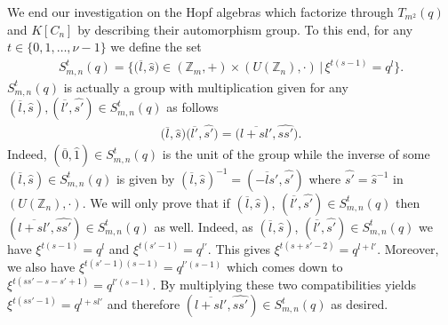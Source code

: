 \documentclass[pdftex]{sigma}
\numberwithin{equation}{section}
\begin{document}
We end our investigation on the Hopf algebras which factorize through $T_{m^{2}}(q)$ and $K[C_n]$ by describing their automorphism group. To this end, for any $t \in \{0, 1,\dots, \nu - 1\}$ we define the set
\begin{gather*}
S^{t}_{m, n}(q) = \big\{\big(\overline{l}, \widehat{s}\big) \in (\mathbb{Z}_{m}, +) \times (U(\mathbb{Z}_{n}), \cdot) \,|\, \xi^{t(s-1)} = q^{l}\big\}.
\end{gather*}
$S^{t}_{m, n}(q)$ is actually a group with multiplication given for any $(\overline{l}, \widehat{s}), (\overline{l'},\widehat{s'}) \in S^{t}_{m, n}(q)$ as follows
\begin{gather*}
\big(\overline{l}, \widehat{s}\big)\big(\overline{l'}, \widehat{s'}\big) = \big(\overline{l+sl'}, \widehat{ss'}\big).
\end{gather*}
Indeed, $(\overline{0}, \widehat{1}) \in S^{t}_{m, n}(q)$ is the unit of the group while the inverse of some $(\overline{l}, \widehat{s}) \in S^{t}_{m, n}(q)$ is given by $(\overline{l}, \widehat{s})^{-1} = (\overline{-ls'}, \widehat{s'})$ where $\widehat{s'} =\widehat{s}^{-1}$ in $(U(\mathbb{Z}_{n}), \cdot)$. We will only prove that if $(\overline{l}, \widehat{s})$, $(\overline{l'},\widehat{s'}) \in S^{t}_{m, n}(q)$ then $(\overline{l+sl'}, \widehat{ss'}) \in S^{t}_{m, n}(q)$ as well. Indeed, as $(\overline{l}, \widehat{s})$, $(\overline{l'}, \widehat{s'})
\in S^{t}_{m, n}(q)$ we have $\xi^{t(s-1)} = q^{l}$ and $\xi^{t(s'-1)} = q^{l'}$. This gives $\xi^{t(s+s'-2)} = q^{l+l'}$. Moreover, we also have $\xi^{t(s'-1)(s-1)} = q^{l'(s-1)}$ which comes down to $\xi^{t(ss'- s - s' + 1)} = q^{l'(s-1)}$. By multiplying these two compatibilities yields $\xi^{t(ss'-1)} = q^{l+sl'}$ and therefore $(\overline{l+sl'}, \widehat{ss'}) \in S^{t}_{m, n}(q)$ as desired.
\end{document}
